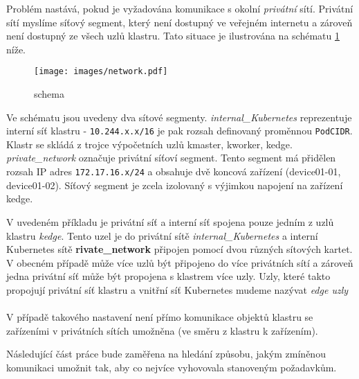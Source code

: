 Problém nastává, pokud je vyžadována komunikace s okolní \textit{privátní} sítí. Privátní sítí myslíme síťový segment, který není dostupný ve veřejném internetu a zároveň není dostupný ze všech uzlů klastru. Tato situace je ilustrována na schématu \ref{fig:schema} níže.

\begin{figure}[!ht]
    \centering
    \texttt{[image: images/network.pdf]}
    \caption{schema}
    \label{fig:schema}
\end{figure}

Ve schématu jsou uvedeny dva sítové segmenty. \textit{internal\_Kubernetes} reprezentuje interní síť klastru - \verb|10.244.x.x/16| je pak rozsah definovaný proměnnou \verb|PodCIDR|. Klastr se skládá z trojce výpočetních uzlů kmaster, kworker, kedge. \textit{private\_network} označuje privátní síťoví segment. Tento segment má přidělen rozsah IP adres \verb|172.17.16.x/24| a obsahuje dvě koncová zařízení (device01-01, device01-02). Síťový segment je zcela izolovaný s výjimkou napojení na zařízení kedge.

V uvedeném příkladu je privátní síť a interní síť spojena pouze jedním z uzlů klastru \textit{kedge}. Tento uzel je do privátní sítě \textit{internal\_Kubernetes} a interní Kubernetes sítě \textbf{rivate\_network} připojen pomocí dvou různých sítových kartet. V obecném případě může více uzlů být připojeno do více privátních sítí a zároveň jedna privátní síť může být propojena s klastrem více uzly. Uzly, které takto propojují privátní síť klastru a vnitřní síť Kubernetes mudeme nazývat \textit{edge uzly}
\\\\
V případě takového nastavení není přímo komunikace objektů klastru se zařízeními v privátních sítích umožněna (ve směru z klastru k zařízením).

Následující část práce bude zaměřena na hledání způsobu, jakým zmíněnou komunikaci umožnit tak, aby co nejvíce vyhovovala stanoveným požadavkům.

